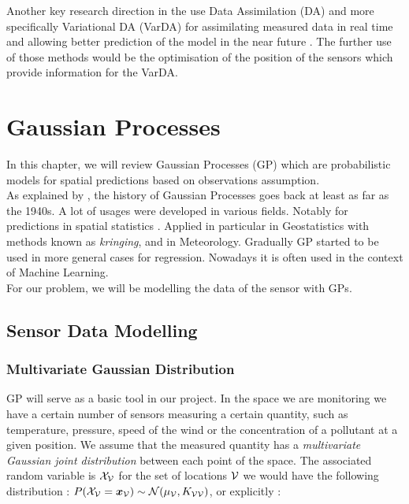 Another key research direction in the use Data Assimilation (DA) and more specifically Variational DA (VarDA) for assimilating measured data in real time and allowing better prediction of the model in the near future \citep{arcucci_effective_2018}. The further use of those methods would be the optimisation of the position of the sensors which provide information for the VarDA.


\section{Gaussian Processes}

In this chapter, we will review Gaussian Processes (GP) which are probabilistic models for spatial predictions based on observations assumption. \\ 

As explained by \citet[p.~29]{rasmussen_gaussian_2006}, the history of Gaussian Processes goes back at least as far as the 1940s. A lot of usages were developed in various fields. Notably for predictions in spatial statistics \citep{cressie_statistics_1991}.  Applied in particular in Geostatistics with methods known as \textit{kringing}, and in Meteorology. Gradually GP started to be used in more general cases for regression. Nowadays it is often used in the context of Machine Learning. \\


For our problem, we will be modelling the data of the sensor with GPs.


\subsection{Sensor Data Modelling}

\subsubsection{Multivariate Gaussian Distribution}

GP will serve as a basic tool in our project. In the space we are monitoring we have a certain number of sensors measuring a certain quantity, such as temperature, pressure, speed of the wind or the concentration of a pollutant at a given position. We assume that the measured quantity has a \textit{multivariate Gaussian joint distribution} between each point of the space. The associated random variable is $\mathcal{X}_{\mathcal{V}}$ for the set of locations $\mathcal{V}$ we would have the following distribution : $P(\mathcal{X}_{\mathcal{V}} = {\boldsymbol{{x}}}_{\mathcal{V}}) \sim \mathcal{N}(\mu_{\mathcal{V}}, K_{\mathcal{V}\mathcal{V}}) $, or explicitly : 


